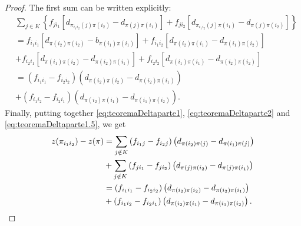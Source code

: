 \begin{proof}
	The first sum can be written explicitly:
	\begin{equation}
	\label{eq:teoremaDeltaparte1.5}
	\begin{split}
	&\sum_{j\in K}
	\left\{f_{ji_1}\left[d_{\pi_{i_1i_2}(j)\pi(i_2)}-d_{\pi(j)\pi(i_1)}\right]
	+
	f_{ji_2}\left[d_{\pi_{i_1i_2}(j)\pi(i_1)}-d_{\pi(j)\pi(i_2)}\right]\right\} \\
	&= 
	f_{i_1i_1}\left[d_{\pi(i_2)\pi(i_2)}-b_{\pi(i_1)\pi(i_1)}\right]+
	f_{i_1i_2}\left[d_{\pi(i_2)\pi(i_1)}-d_{\pi(i_1)\pi(i_2)}\right]\\
	&+f_{i_2i_1}\left[d_{\pi(i_1)\pi(i_2)}-d_{\pi(i_2)\pi(i_1)}\right]+
	f_{i_2i_2}\left[d_{\pi(i_1)\pi(i_1)}-d_{\pi(i_2)\pi(i_2)}\right]\\
	&=\left(f_{i_1i_1}-f_{i_2i_2}\right)\left(d_{\pi(i_2)\pi(i_2)}-d_{\pi(i_2)\pi(i_1)}\right)\\
	&+\left(f_{i_1i_2}-f_{i_2i_1}\right)\left(d_{\pi(i_2)\pi(i_1)}-d_{\pi(i_1)\pi(i_2)}\right).
	\end{split}
	\end{equation}
	Finally, putting together \eqref{eq:teoremaDeltaparte1}, \eqref{eq:teoremaDeltaparte2} and \eqref{eq:teoremaDeltaparte1.5}, we get
	\[
	\begin{split}
	z(\pi_{i_1 i_2})-z(\pi) &= 
	\sum_{j \notin K} \left(f_{i_1j}-f_{i_2j}\right)\left(d_{\pi(i_2)\pi(j)}-d_{\pi(i_1)\pi(j)} \right) \\
	&+\sum_{j \notin K}\left(f_{ji_1}-f_{ji_2}\right)\left(d_{\pi(j)\pi(i_2)}-d_{\pi(j)\pi(i_1)} \right) \\
	&=\left(f_{i_1i_1}-f_{i_2i_2}\right)\left(d_{\pi(i_2)\pi(i_2)}-d_{\pi(i_2)\pi(i_1)}\right)\\
	&+\left(f_{i_1i_2}-f_{i_2i_1}\right)\left(d_{\pi(i_2)\pi(i_1)}-d_{\pi(i_1)\pi(i_2)}\right).\qedhere
	\end{split}
	\]
	
\end{proof}
